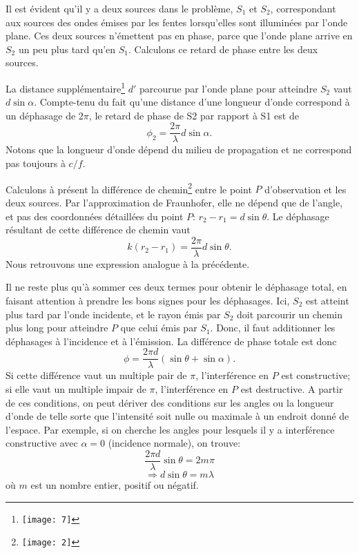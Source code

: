 Il est évident qu'il y a deux sources dans le problème, $S_1$ et $S_2$, correspondant aux sources des ondes émises par les fentes lorsqu'elles sont illuminées par l'onde plane. Ces deux sources n'émettent pas en phase, parce que l'onde plane arrive en $S_2$ un peu plus tard qu'en $S_1$. 
Calculons ce retard de phase entre les deux sources.

La distance supplémentaire\footnote{\texttt{[image: 7]}} $d'$ parcourue par l'onde plane pour atteindre $S_2$ vaut $d\sin\alpha$. Compte-tenu du fait qu'une distance d'une longueur d'onde correspond à un déphasage de $2\pi$, le retard de phase de S2 par rapport à S1 est de 
$$ \phi_2=\frac{2\pi}{\lambda}d\sin\alpha.$$ 
Notons que la longueur d'onde dépend du milieu de propagation et ne correspond pas toujours à $c/f$.

Calculons à présent la différence de chemin\footnote{
\texttt{[image: 2]}} entre le point $P$ d'observation et les deux sources. Par l'approximation de Fraunhofer, elle ne dépend que de l'angle, et pas des coordonnées détaillées du point $P$: $r_2-r_1=d\sin\theta$.
Le déphasage résultant de cette différence de chemin vaut 
$$k(r_2-r_1)=\frac{2\pi}{\lambda}d\sin\theta.$$ 
Nous retrouvons une expression analogue à la précédente.

Il ne reste plus qu'à sommer ces deux termes pour obtenir le déphasage total, en faisant attention à prendre les bons signes pour les déphasages. Ici, $S_2$ est atteint plus tard par l'onde incidente, et le rayon émis par $S_2$ doit parcourir un chemin plus long pour atteindre $P$ que celui émis par $S_1$. Donc, il faut additionner les déphasages à l'incidence et à l'émission. La différence de phase totale est donc 
$$\phi=\frac{2\pi d}{\lambda}(\sin \theta +\sin \alpha).$$
Si cette différence vaut un multiple pair de $\pi$, l'interférence en $P$ est constructive; si elle vaut un multiple impair de $\pi$, l'interférence en $P$ est destructive. A partir de ces conditions, on peut dériver des conditions sur les angles ou la longueur d'onde de telle sorte que l'intensité soit nulle ou maximale à un endroit donné de l'espace. Par exemple, si on cherche les angles pour lesquels il y a interférence constructive avec $\alpha=0$ (incidence normale), on trouve: 
$$ \frac{2\pi d}{\lambda}\sin \theta=2m\pi$$
$$ \Rightarrow d \sin \theta =m\lambda$$
 où $m$ est un nombre entier, positif ou négatif. 
 
